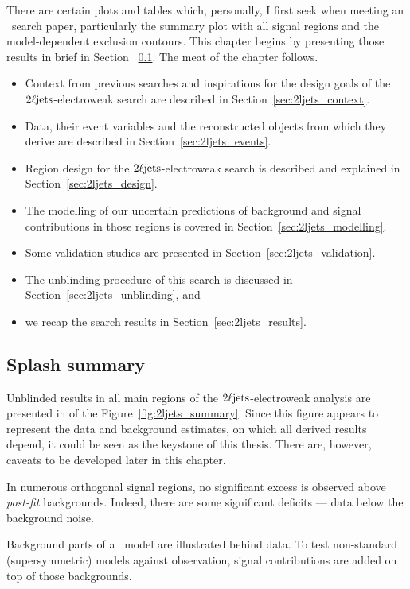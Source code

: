 There are certain plots and tables which, personally, I first seek when
meeting an \atlas\ search paper, particularly the summary plot with all signal
regions and the model-dependent exclusion contours.
This chapter begins by presenting those results in brief in Section
~\ref{sec:2ljets_splash}.
The meat of the chapter follows.
\begin{itemize}
\item Context from previous searches and inspirations for the design goals
of the $2\ell\mathrm{jets}$-electroweak search are described in
Section~\ref{sec:2ljets_context}.
\item Data, their event variables and the reconstructed objects from which
they derive are described in Section~\ref{sec:2ljets_events}.
\item Region design for the $2\ell\mathrm{jets}$-electroweak search is described and
explained in Section~\ref{sec:2ljets_design}.
\item The modelling of our uncertain predictions of background and signal
contributions in those regions is covered in
Section~\ref{sec:2ljets_modelling}.
\item Some validation studies are presented in Section~\ref{sec:2ljets_validation}.
\item The unblinding procedure of this search is discussed in
Section~\ref{sec:2ljets_unblinding}, and
\item we recap the search results in Section~\ref{sec:2ljets_results}.
\end{itemize}


\subsection{Splash summary}
\label{sec:2ljets_splash}
Unblinded results in all main regions of the $2\ell\mathrm{jets}$-electroweak analysis
are presented in of the Figure~\ref{fig:2ljets_summary}.
Since this figure appears to represent the data and background estimates,
on which all derived results depend, it could be seen as the keystone of this
thesis.
There are, however, caveats to be developed later in this chapter.

In numerous orthogonal signal regions, no significant excess is observed
above \emph{post-fit} backgrounds.
Indeed, there are some significant deficits --- data below the background noise.

Background parts of a \heplikelihood\ model are illustrated behind data.
To test non-standard (supersymmetric) models against observation, signal
contributions are added on top of those backgrounds.

